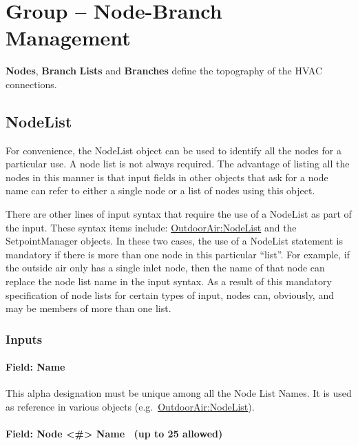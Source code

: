 \section{Group -- Node-Branch Management}\label{group-node-branch-management}

\textbf{Nodes}, \textbf{Branch} \textbf{Lists} and \textbf{Branches} define the topography of the HVAC connections.

\subsection{NodeList}\label{nodelist}

For convenience, the NodeList object can be used to identify all the nodes for a particular use. A node list is not always required. The advantage of listing all the nodes in this manner is that input fields in other objects that ask for a node name can refer to either a single node or a list of nodes using this object.

There are other lines of input syntax that require the use of a NodeList as part of the input. These syntax items include: \hyperref[outdoorairnodelist]{OutdoorAir:NodeList} and the SetpointManager objects. In these two cases, the use of a NodeList statement is mandatory if there is more than one node in this particular ``list''. For example, if the outside air only has a single inlet node, then the name of that node can replace the node list name in the input syntax. As a result of this mandatory specification of node lists for certain types of input, nodes can, obviously, and may be members of more than one list.

\subsubsection{Inputs}\label{inputs-027}

\paragraph{Field: Name}\label{field-name-026}

This alpha designation must be unique among all the Node List Names. It is used as reference in various objects (e.g.~\hyperref[outdoorairnodelist]{OutdoorAir:NodeList}).

\paragraph{Field: Node \textless{}\#\textgreater{} Name ~(up to 25 allowed)}\label{field-node-name-up-to-25-allowed}

